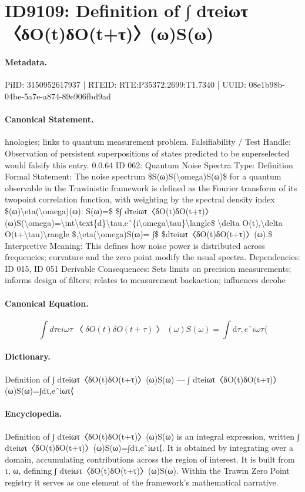 \section*{ID9109: Definition of ∫ dτeiωτ〈δO(t)δO(t+τ)〉(ω)S(ω)}
\paragraph{Metadata.}
PiID: 3150952617937 | RTEID: RTE:P35372.2699:T1.7340 | UUID: 08e1b98b-04be-5a7e-a874-89e906fbd9ad

\paragraph{Canonical Statement.}
hnologies; links to quantum measurement problem. Falsifiability / Test Handle: Observation of persistent superpositions of states predicted to be superselected would falsify this entry. 0.0.64 ID 062: Quantum Noise Spectra Type: Definition Formal Statement: The noise spectrum \$S(ω)S(\textbackslash{}omega)S(ω)\$ for a quantum observable in the Trawinistic framework is defined as the Fourier transform of its twopoint correlation function, with weighting by the spectral density index \$(ω)\textbackslash{}eta(\textbackslash{}omega)(ω): S(ω)=\$ \$∫ dτeiωτ〈δO(t)δO(t+τ)〉(ω)S(\textbackslash{}omega)=\textbackslash{}int\textbackslash{}text\{d\}\textbackslash{}tau,eˆ\{i\textbackslash{}omega\textbackslash{}tau\}\textbackslash{}langle\$ \textbackslash{}delta O(t),\textbackslash{}delta O(t+\textbackslash{}tau)\textbackslash{}rangle \$,\textbackslash{}eta(\textbackslash{}omega)S(ω)= ∫\$ \$dτeiωτ〈δO(t)δO(t+τ)〉(ω).\$ Interpretive Meaning: This defines how noise power is distributed across frequencies; curvature and the zero point modify the usual spectra. Dependencies: ID 015, ID 051 Derivable Consequences: Sets limits on precision measurements; informs design of filters; relates to measurement backaction; influences decohe

\paragraph{Canonical Equation.}
\[
∫ dτeiωτ〈δO(t)δO(t+τ)〉(ω)S(\omega)=\int\text{d}\tau,eˆ{i\omega\tau}\langle
\]

\paragraph{Dictionary.}
Definition of ∫ dτeiωτ〈δO(t)δO(t+τ)〉(ω)S(ω) — ∫ dτeiωτ〈δO(t)δO(t+τ)〉(ω)S(ω)=∫dτ,eˆiωτ⟨

\paragraph{Encyclopedia.}
Definition of ∫ dτeiωτ〈δO(t)δO(t+τ)〉(ω)S(ω) is an integral expression, written ∫ dτeiωτ〈δO(t)δO(t+τ)〉(ω)S(ω)=∫dτ,eˆiωτ⟨. It is obtained by integrating over a domain, accumulating contributions across the region of interest. It is built from τ, ω, defining ∫ dτeiωτ〈δO(t)δO(t+τ)〉(ω)S(ω). Within the Trawin Zero Point registry it serves as one element of the framework's mathematical narrative.
